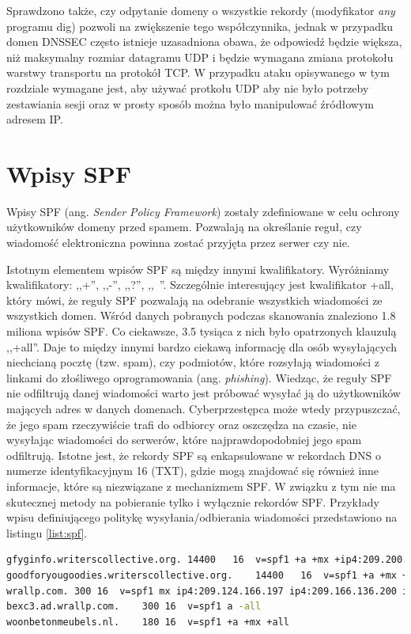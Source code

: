 Sprawdzono także, czy odpytanie domeny o wszystkie
rekordy (modyfikator \textit{any} programu dig) pozwoli na zwiększenie tego współczynnika, jednak w przypadku domen DNSSEC często
istnieje uzasadniona obawa, że odpowiedź będzie większa, niż maksymalny rozmiar datagramu UDP i będzie wymagana zmiana
protokołu warstwy transportu na protokół TCP. W przypadku ataku opisywanego w tym rozdziale wymagane jest, aby używać protkołu UDP
aby nie było potrzeby zestawiania sesji oraz w prosty sposób można było manipulować źródłowym adresem IP.

\section{Wpisy SPF}
\noindent Wpisy SPF (ang. \textit{Sender Policy Framework}) zostały zdefiniowane w celu ochrony użytkowników domeny przed spamem. Pozwalają na określanie reguł, czy wiadomość
elektroniczna powinna zostać przyjęta przez serwer czy nie.

Istotnym elementem wpisów SPF są między innymi kwalifikatory. Wyróżniamy kwalifikatory: ,,+'', ,,-'', ,,?'', ,,~''. Szczególnie
interesujący jest kwalifikator +all, który mówi, że reguły SPF pozwalają na odebranie wszystkich wiadomości ze wszystkich domen.
Wśród danych pobranych podczas skanowania znaleziono 1.8 miliona wpisów SPF. Co ciekawsze, 3.5 tysiąca z nich było opatrzonych
klauzulą ,,+all''. Daje to między innymi bardzo ciekawą informację dla osób wysyłających niechcianą pocztę (tzw. spam), czy
podmiotów, które rozsyłają wiadomości z linkami do złośliwego oprogramowania (ang. \textit{phishing}). Wiedząc,
że reguły SPF nie odfiltrują danej wiadomości warto jest próbować wysyłać ją do użytkowników mających adres w danych domenach.
Cyberprzestępca może wtedy przypuszczać, że jego spam rzeczywiście trafi do odbiorcy oraz oszczędza na czasie, nie wysyłając
wiadomości do serwerów, które najprawdopodobniej jego spam odfiltrują. Istotne jest, że rekordy SPF są enkapsulowane w rekordach DNS
o numerze identyfikacyjnym 16 (TXT), gdzie mogą znajdować się również inne informacje, które są niezwiązane z mechanizmem SPF.
W związku z tym nie ma skutecznej metody na pobieranie tylko i wyłącznie rekordów SPF. Przykłady wpisu definiującego politykę
wysyłania/odbierania wiadomości przedstawiono na listingu \ref{list:spf}.

\begin{lstlisting}[label={list:spf},captionpos=b,caption=Przykład odebranych rekordów SPF.,language=bash]
gfyginfo.writerscollective.org.	14400	16	v=spf1 +a +mx +ip4:209.200.229.240 ~all
goodforyougoodies.writerscollective.org.	14400	16	v=spf1 +a +mx +ip4:209.200.229.240 ~all
wrallp.com.	300	16	v=spf1 mx ip4:209.124.166.197 ip4:209.166.136.200 ip4:4.35.225.147 -all
bexc3.ad.wrallp.com.	300	16	v=spf1 a -all
woonbetonmeubels.nl.	180	16	v=spf1 +a +mx +all
\end{lstlisting}

